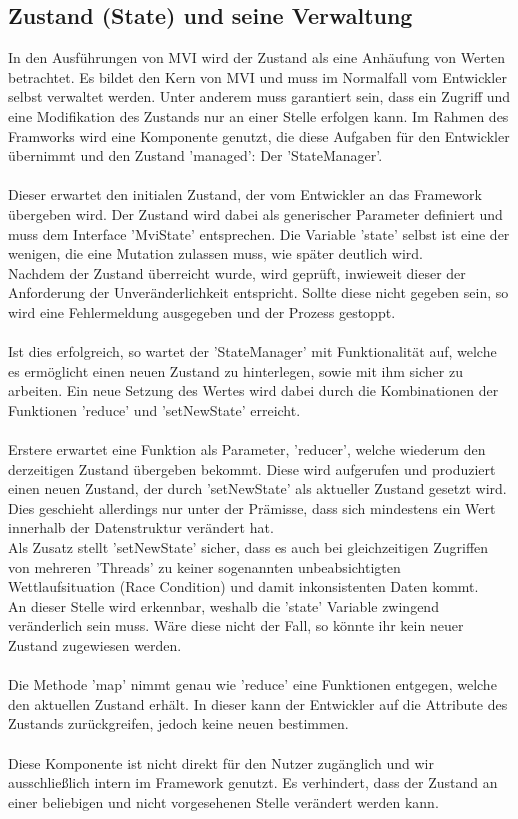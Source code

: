\subsection{Zustand (State) und seine Verwaltung}
\label{subsec:zustand-und-statemanager}
In den Ausführungen von MVI wird der Zustand als eine Anhäufung von Werten betrachtet. Es bildet den Kern von MVI und muss im Normalfall vom Entwickler selbst verwaltet werden. Unter anderem muss garantiert sein, dass ein Zugriff und eine Modifikation des Zustands nur an einer Stelle erfolgen kann. Im Rahmen des Framworks wird eine Komponente genutzt, die diese Aufgaben für den Entwickler übernimmt und den Zustand 'managed': Der 'StateManager'.
\\\\
Dieser erwartet den initialen Zustand, der vom Entwickler an das Framework übergeben wird. Der Zustand wird dabei als generischer Parameter definiert und muss dem Interface 'MviState' entsprechen. Die Variable 'state' selbst ist eine der wenigen, die eine Mutation zulassen muss, wie später deutlich wird.
\\
Nachdem der Zustand überreicht wurde, wird geprüft, inwieweit dieser der Anforderung der Unveränderlichkeit entspricht. Sollte diese nicht gegeben sein, so wird eine Fehlermeldung ausgegeben und der Prozess gestoppt.
\\\\
Ist dies erfolgreich, so wartet der 'StateManager' mit Funktionalität auf, welche es ermöglicht einen neuen Zustand zu hinterlegen, sowie mit ihm sicher zu arbeiten. Ein neue Setzung des Wertes wird dabei durch die Kombinationen der Funktionen 'reduce' und 'setNewState' erreicht. 
\\\\
Erstere erwartet eine Funktion als Parameter, 'reducer', welche wiederum den derzeitigen Zustand übergeben bekommt. Diese wird aufgerufen und produziert einen neuen Zustand, der durch 'setNewState' als aktueller Zustand gesetzt wird. Dies geschieht allerdings nur unter der Prämisse, dass sich mindestens ein Wert innerhalb der Datenstruktur verändert hat.
\\
Als Zusatz stellt 'setNewState' sicher, dass es auch bei gleichzeitigen Zugriffen von mehreren 'Threads' zu keiner sogenannten unbeabsichtigten Wettlaufsituation (Race Condition) und damit inkonsistenten Daten kommt.
\\
An dieser Stelle wird erkennbar, weshalb die 'state' Variable zwingend veränderlich sein muss. Wäre diese nicht der Fall, so könnte ihr kein neuer Zustand zugewiesen werden.
\\\\
Die Methode 'map' nimmt genau wie 'reduce' eine Funktionen entgegen, welche den aktuellen Zustand erhält. In dieser kann der Entwickler auf die Attribute des Zustands zurückgreifen, jedoch keine neuen bestimmen.
\\\\
Diese Komponente ist nicht direkt für den Nutzer zugänglich und wir ausschließlich intern im Framework genutzt. Es verhindert, dass der Zustand an einer beliebigen und nicht vorgesehenen Stelle verändert werden kann.

